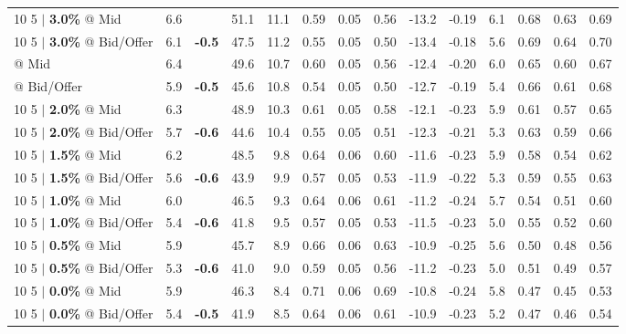 \documentclass{beamer}
\begin{document}
\begin{frame}
\begin{table}
{\begin{tabular}{lrcrrrrrrrrrrr}
\midrule

\addlinespace
{10 5 $|$ \bf 3.0\%} @ Mid & 6.6 & & 51.1 & 11.1 & 0.59 & 0.05 & 0.56 & -13.2 & -0.19 & 6.1 & 0.68 & 0.63 & 0.69\\
{10 5 $|$ \bf 3.0\%} @ Bid/Offer & 6.1 & {\bf \color{red}-0.5} & 47.5 & 11.2 & 0.55 & 0.05 & 0.50 & -13.4 & -0.18 & 5.6 & 0.69 & 0.64 & 0.70\\
\addlinespace
\color{blue}{10 5 $|$ \bf 2.5\%} @ Mid & 6.4 & & 49.6 & 10.7 & 0.60 & 0.05 & 0.56 & -12.4 & -0.20 & 6.0 & 0.65 & 0.60 & 0.67\\
\color{blue}{10 5 $|$ \bf 2.5\%} @ Bid/Offer & 5.9 & {\bf \color{red}-0.5} & 45.6 & 10.8 & 0.54 & 0.05 & 0.50 & -12.7 & -0.19 & 5.4 & 0.66 & 0.61 & 0.68\\
\addlinespace
{10 5 $|$ \bf 2.0\%} @ Mid & 6.3 & & 48.9 & 10.3 & 0.61 & 0.05 & 0.58 & -12.1 & -0.23 & 5.9 & 0.61 & 0.57 & 0.65\\
{10 5 $|$ \bf 2.0\%} @ Bid/Offer & 5.7 & {\bf \color{red}-0.6} & 44.6 & 10.4 & 0.55 & 0.05 & 0.51 & -12.3 & -0.21 & 5.3 & 0.63 & 0.59 & 0.66\\
\addlinespace
{10 5 $|$ \bf 1.5\%} @ Mid & 6.2 & & 48.5 & 9.8 & 0.64 & 0.06 & 0.60 & -11.6 & -0.23 & 5.9 & 0.58 & 0.54 & 0.62\\
{10 5 $|$ \bf 1.5\%} @ Bid/Offer & 5.6 & {\bf \color{red}-0.6} & 43.9 & 9.9 & 0.57 & 0.05 & 0.53 & -11.9 & -0.22 & 5.3 & 0.59 & 0.55 & 0.63\\
\addlinespace
{10 5 $|$ \bf 1.0\%} @ Mid & 6.0 & & 46.5 & 9.3 & 0.64 & 0.06 & 0.61 & -11.2 & -0.24 & 5.7 & 0.54 & 0.51 & 0.60\\
{10 5 $|$ \bf 1.0\%} @ Bid/Offer & 5.4 & {\bf \color{red}-0.6} & 41.8 & 9.5 & 0.57 & 0.05 & 0.53 & -11.5 & -0.23 & 5.0 & 0.55 & 0.52 & 0.60\\
\addlinespace
{10 5 $|$ \bf 0.5\%} @ Mid & 5.9 & & 45.7 & 8.9 & 0.66 & 0.06 & 0.63 & -10.9 & -0.25 & 5.6 & 0.50 & 0.48 & 0.56\\
{10 5 $|$ \bf 0.5\%} @ Bid/Offer & 5.3 & {\bf \color{red}-0.6} & 41.0 & 9.0 & 0.59 & 0.05 & 0.56 & -11.2 & -0.23 & 5.0 & 0.51 & 0.49 & 0.57\\
\addlinespace
{10 5 $|$ \bf 0.0\%} @ Mid & 5.9 & & 46.3 & 8.4 & 0.71 & 0.06 & 0.69 & -10.8 & -0.24 & 5.8 & 0.47 & 0.45 & 0.53\\
{10 5 $|$ \bf 0.0\%} @ Bid/Offer & 5.4 & {\bf \color{red}-0.5} & 41.9 & 8.5 & 0.64 & 0.06 & 0.61 & -10.9 & -0.23 & 5.2 & 0.47 & 0.46 & 0.54\\
\bottomrule
\end{tabular}
}
\end{table}
\end{frame}
\end{document}
